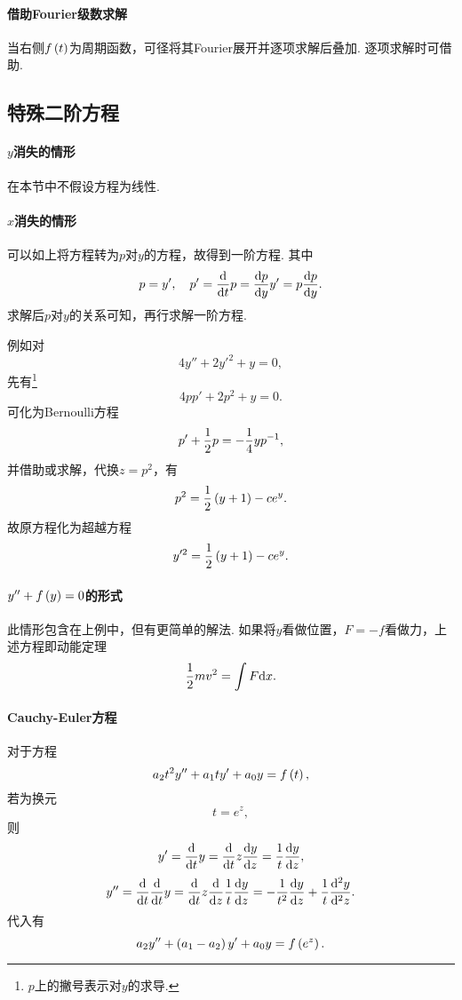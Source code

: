 \documentclass[UTF-8]{ctexart}
\begin{document}
  \paragraph{借助Fourier级数求解}当右侧$f\left(t\right)$为周期函数，可径将其Fourier展开并逐项求解后叠加. 逐项求解时可借助.
  \subsection{特殊二阶方程}
  \paragraph{$y$消失的情形}在本节中不假设方程为线性.
  \paragraph{$x$消失的情形}可以如上将方程转为$p$对$y$的方程，故得到一阶方程. 其中\[ p=y',\quad p'=\frac{\mathrm{d}}{\mathrm{d} t}{p}=\frac{\mathrm{d} p}{\mathrm{d} y}y'=p\frac{\mathrm{d} p}{\mathrm{d} y}.\]求解后$p$对$y$的关系可知，再行求解一阶方程.
  \begin{ex}
  例如对
  \[ 4y''+2y'^2+y=0, \]
  先有\footnote{$p$上的撇号表示对$y$的求导.}
  \[ 4pp' + 2p^2 + y=0. \]
  可化为Bernoulli方程
  \[ p' + \frac{1}{2} p = -\frac{1}{4}yp^{-1}, \]
  并借助或求解，代换$z=p^2$，有
  \[ p^2 = \frac{1}{2}\left(y+1\right)-ce^y. \]
  故原方程化为超越方程
  \[ y'^2 = \frac{1}{2}\left(y+1\right)-ce^y. \]
  \end{ex}
  \paragraph{$y''+f\left(y\right)=0$的形式}\label{par:y2y}此情形包含在上例中，但有更简单的解法.
  如果将$y$看做位置，$F=-f$看做力，上述方程即动能定理
  \[ \frac{1}{2} mv^2 = \int F \mathrm{d} x. \]
  \paragraph{Cauchy-Euler方程}
  对于方程\[ a_2 t^2 y'' + a_1 t y' + a_0 y = f\left(t\right), \]
  若为换元
  \[ t = e^z, \]
  则
  \[ y' = \frac{\mathrm{d}}{\mathrm{d} t}{y} = \frac{\mathrm{d}}{\mathrm{d} t}{z}\frac{\mathrm{d} y}{\mathrm{d} z} = \frac{1}{t}\frac{\mathrm{d} y}{\mathrm{d} z}, \]
  \[ y'' = \frac{\mathrm{d}}{\mathrm{d} t}{}\frac{\mathrm{d}}{\mathrm{d} t}{y} = \frac{\mathrm{d}}{\mathrm{d} t}{z}\frac{\mathrm{d} }{\mathrm{d} z}{\frac{1}{t}\frac{\mathrm{d} y}{\mathrm{d} z}} = -\frac{1}{t^2}\frac{\mathrm{d} y}{\mathrm{d} z}+\frac{1}{t}\frac{\mathrm{d}^2 y}{\mathrm{d}^2 z}. \]
  代入有
  \[ a_2 y'' + \left(a_1-a_2\right)y'+a_0y=f\left(e^z\right). \]
\end{document}
